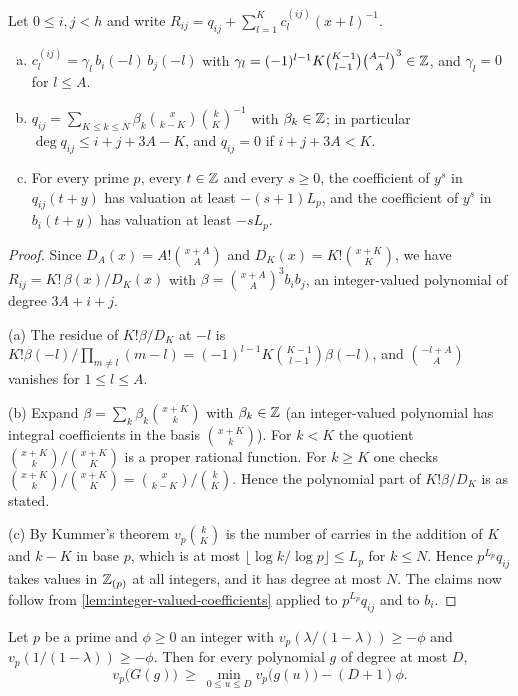 \begin{lemma}\label{lem:integral-valued}
Let $0\le i,j<h$ and write $R_{ij}=q_{ij}+\sum_{l=1}^Kc^{(ij)}_l(x+l)^{-1}$.
\begin{enumerate}[(a)]
\item $c^{(ij)}_l=\gamma_l\,b_i(-l)\,b_j(-l)$ with $\gamma_l=(-1)^{l-1}K\binom{K-1}{l-1}\binom{A-l}{A}^3\in\mathbb{Z}$, and $\gamma_l=0$ for $l\le A$.
\item $q_{ij}=\sum_{K\le k\le N}\beta_k\binom{x}{k-K}\binom kK^{-1}$ with $\beta_k\in\mathbb{Z}$; in particular $\deg q_{ij}\le i+j+3A-K$, and $q_{ij}=0$ if $i+j+3A<K$.
\item For every prime $p$, every $t\in\mathbb{Z}$ and every $s\ge0$, the coefficient of $y^s$ in $q_{ij}(t+y)$ has valuation at least $-(s+1)L_p$, and the coefficient of $y^s$ in $b_i(t+y)$ has valuation at least $-sL_p$.
\end{enumerate}
\end{lemma}

\begin{proof}
Since $D_A(x)=A!\binom{x+A}{A}$ and $D_K(x)=K!\binom{x+K}{K}$, we have $R_{ij}=K!\,\beta(x)/D_K(x)$ with $\beta=\binom{x+A}A^3b_ib_j$, an integer-valued polynomial of degree $3A+i+j$.

(a) The residue of $K!\beta/D_K$ at $-l$ is $K!\beta(-l)/\prod_{m\ne l}(m-l)=(-1)^{l-1}K\binom{K-1}{l-1}\beta(-l)$, and $\binom{-l+A}{A}$ vanishes for $1\le l\le A$.

(b) Expand $\beta=\sum_k\beta_k\binom{x+K}{k}$ with $\beta_k\in\mathbb{Z}$ (an integer-valued polynomial has integral coefficients in the basis $\binom{x+K}k$). For $k<K$ the quotient $\binom{x+K}k/\binom{x+K}K$ is a proper rational function. For $k\ge K$ one checks $\binom{x+K}k/\binom{x+K}K=\binom{x}{k-K}/\binom kK$. Hence the polynomial part of $K!\beta/D_K$ is as stated.

(c) By Kummer's theorem $v_p\binom kK$ is the number of carries in the addition of $K$ and $k-K$ in base $p$, which is at most $\lfloor\log k/\log p\rfloor\le L_p$ for $k\le N$. Hence $p^{L_p}q_{ij}$ takes values in $\mathbb{Z}_{(p)}$ at all integers, and it has degree at most $N$. The claims now follow from \cref{lem:integer-valued-coefficients} applied to $p^{L_p}q_{ij}$ and to $b_i$.
\end{proof}

\begin{lemma}\label{lem:newton}
Let $p$ be a prime and $\phi\ge0$ an integer with $v_p(\lambda/(1-\lambda))\ge-\phi$ and $v_p(1/(1-\lambda))\ge-\phi$. Then for every polynomial $g$ of degree at most $D$,
\[
v_p\bigl(G(g)\bigr)\ \ge\ \min_{0\le u\le D}v_p\bigl(g(u)\bigr)-(D+1)\phi .
\]
\end{lemma}

